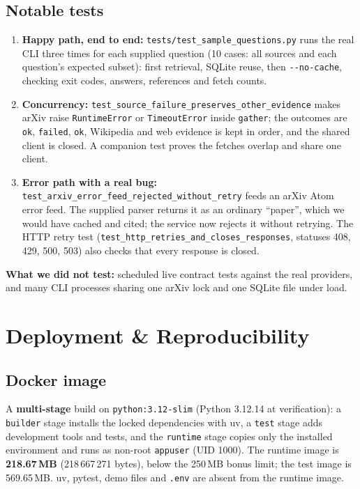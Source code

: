 \documentclass[11pt,a4paper]{article}
\newcommand{\imagesize}{218.67\,MB}
\newcommand{\cmd}[1]{\texttt{#1}}
\begin{document}
\subsection{Notable tests}

\begin{enumerate}[leftmargin=*,itemsep=2pt]
\item \textbf{Happy path, end to end:} \cmd{tests/test\_sample\_questions.py} runs
  the real CLI three times for each supplied question (10 cases: all sources and
  each question's expected subset): first retrieval, SQLite reuse, then
  \cmd{-{}-no-cache}, checking exit codes, answers, references and fetch counts.
\item \textbf{Concurrency:} \cmd{test\_source\_failure\_preserves\_other\_evidence}
  makes arXiv raise \texttt{RuntimeError} or \texttt{TimeoutError} inside
  \cmd{gather}; the outcomes are \cmd{ok}, \cmd{failed}, \cmd{ok}, Wikipedia and
  web evidence is kept in order, and the shared client is closed. A companion
  test proves the fetches overlap and share one client.
\item \textbf{Error path with a real bug:}
  \cmd{test\_arxiv\_error\_feed\_rejected\_without\_retry} feeds an arXiv Atom error
  feed. The supplied parser returns it as an ordinary ``paper'', which we would
  have cached and cited; the service now rejects it without retrying. The HTTP
  retry test (\cmd{test\_http\_retries\_and\_closes\_responses}, statuses 408, 429,
  500, 503) also checks that every response is closed.
\end{enumerate}

\textbf{What we did not test:} scheduled live contract tests against the real
providers, and many CLI processes sharing one arXiv lock and one SQLite file
under load.

\section{Deployment \& Reproducibility}\label{sec:deploy}

\subsection{Docker image}

A \textbf{multi-stage} build on \cmd{python:3.12-slim} (Python 3.12.14 at
verification): a \cmd{builder} stage installs the locked dependencies with uv, a
\cmd{test} stage adds development tools and tests, and the \cmd{runtime} stage
copies only the installed environment and runs as non-root \cmd{appuser}
(UID 1000). The runtime image is \textbf{\imagesize{}} (218\,667\,271 bytes), below
the 250\,MB bonus limit; the test image is 569.65\,MB. uv, pytest, demo files and
\cmd{.env} are absent from the runtime image.
\end{document}
